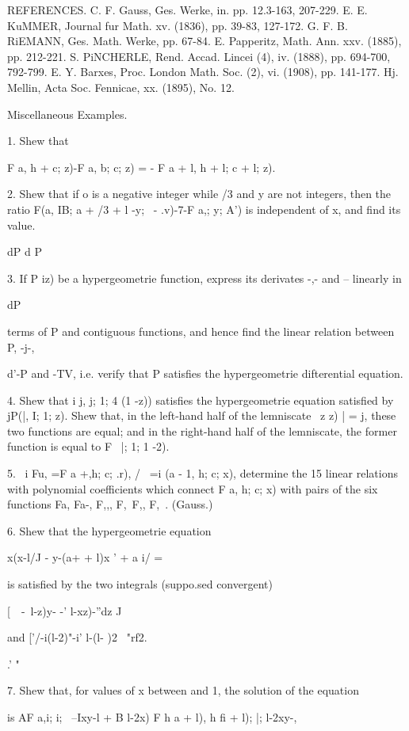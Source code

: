 REFERENCES. C. F. Gauss, Ges. Werke, in. pp. 12.3-163, 207-229. E. E.
KuMMER, Journal fur Math. xv. (1836), pp. 39-83, 127-172. G. F. B.
RiEMANN, Ges. Math. Werke, pp. 67-84. E. Papperitz, Math. Ann. xxv.
(1885), pp. 212-221. S. PiNCHERLE, Rend. Accad. Lincei (4), iv.
(1888), pp. 694-700, 792-799. E. Y. Barxes, Proc. London Math. Soc.
(2), vi. (1908), pp. 141-177. Hj. Mellin, Acta Soc. Fennicae, xx.
(1895), No. 12.

Miscellaneous Examples.

1. Shew that

F a, h + \; c; z)-F a, b; c; z) = - F a + l, h + l; c + l; z).

2. Shew that if o is a negative integer while /3 and y are not
integers, then the ratio F(a, IB; a + /3 + l -y; \ - .v)-7-F a,; y;
A') is independent of x, and find its value.

%
%

dP d P

3. If P iz) be a hypergeometrie function, express its derivates -,-
and -- linearly in

dP

terms of P and contiguous functions, and hence find the linear
relation between P, -j-,

d'-P and -TV, i.e. verify that P satisfies the hypergeometrie
difterential equation.

4. Shew that i j, j; 1; 4 (1 -z)) satisfies the hypergeometrie
equation satisfied by jP(|, I; 1; z). Shew that, in the left-hand
half of the lemniscate \ z z) | = j, these two functions are equal;
and in the right-hand half of the lemniscate, the former function is
equal to F \, |; 1; 1 -2).

5. \ i Fu, =F a +,h; c; .r), / \ =i (a - 1, h; c; x), determine the
15 linear relations with polynomial coefficients which connect F a, h;
c; x) with pairs of the six functions Fa, Fa-, F,,, F,\, F,, F,\ .
(Gauss.)

6. Shew that the hypergeometrie equation

x(x-l/J - y-(a+ + l)x ' + a i/ =

is satisfied by the two integrals (suppo.sed convergent)

[\ \ -\ l-z)y- -' l-xz)-''dz J

and ['/-i(l-2)"-i' l-(l- )2 ~"rf2.

.' "

7. Shew that, for values of x between and 1, the solution of the
equation

is AF a,i; i; \ --Ixy-l + B l-2x) F h a + l), h fi + l); |; l-2xy-,

